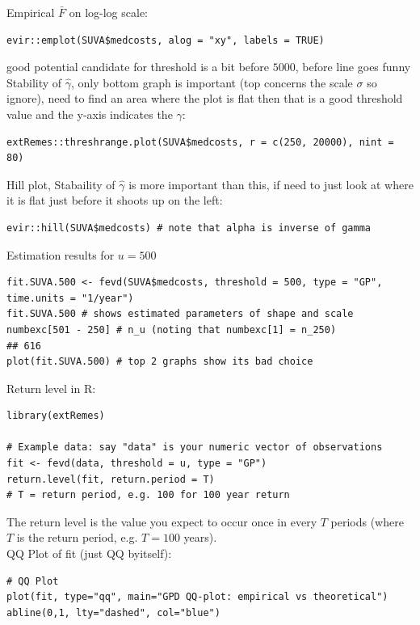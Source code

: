 \documentclass{article}
\begin{document}
\noindent Empirical $\bar{F}$ on log-log scale:
\begin{lstlisting}
evir::emplot(SUVA$medcosts, alog = "xy", labels = TRUE)
\end{lstlisting}


\noindent good potential candidate for threshold is a bit before $5000$, before line goes funny \\

\noindent Stability of $\hat{\gamma}$, only bottom graph is important (top concerns the scale $\sigma$ so ignore), need to find an area where the plot is flat then that is a good threshold value and the y-axis indicates the $\gamma$:
\begin{lstlisting}
extRemes::threshrange.plot(SUVA$medcosts, r = c(250, 20000), nint = 80)
\end{lstlisting}

\noindent Hill plot, Stabaility of $\hat{\gamma}$ is more important than this, if need to just look at where it is flat just before it shoots up on the left:
\begin{lstlisting}
evir::hill(SUVA$medcosts) # note that alpha is inverse of gamma
\end{lstlisting}


\noindent Estimation results for $u=500$
\begin{lstlisting}
fit.SUVA.500 <- fevd(SUVA$medcosts, threshold = 500, type = "GP",
time.units = "1/year")
fit.SUVA.500 # shows estimated parameters of shape and scale
numbexc[501 - 250] # n_u (noting that numbexc[1] = n_250)
## 616
plot(fit.SUVA.500) # top 2 graphs show its bad choice
\end{lstlisting}



\noindent Return level in R:
\begin{lstlisting}
library(extRemes)

# Example data: say "data" is your numeric vector of observations
fit <- fevd(data, threshold = u, type = "GP")
return.level(fit, return.period = T)
# T = return period, e.g. 100 for 100 year return
\end{lstlisting}
\noindent The return level is the value you expect to occur once in every $T$ periods (where $T$ is the return period, e.g. $T = 100$ years). \\

\noindent QQ Plot of fit (just QQ byitself):
\begin{lstlisting}
# QQ Plot
plot(fit, type="qq", main="GPD QQ-plot: empirical vs theoretical")
abline(0,1, lty="dashed", col="blue")
\end{lstlisting}
\end{document}
